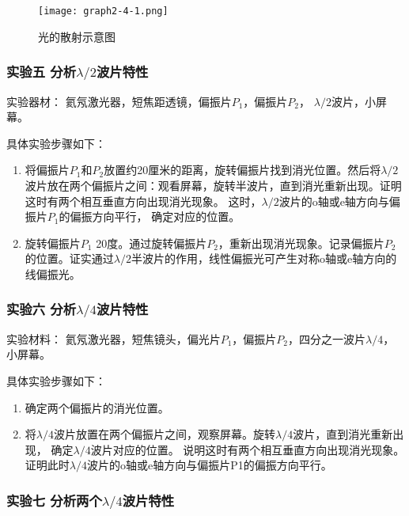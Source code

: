 \documentclass[dvipsnames, svgnames,a4paper,11pt]{article}
\begin{document}
	\begin{figure}[htbp]
		\centering
		\texttt{[image: graph2-4-1.png]}
		\caption{光的散射示意图}
		\label{fig:graph2-4-1}
	\end{figure}



	\subsubsection{实验五 \quad 分析$\lambda/2$波片特性}

	实验器材： 氦氖激光器，短焦距透镜，偏振片$P_1$，偏振片$P_2$， $\lambda/2$波片，小屏幕。

	具体实验步骤如下：
	\begin{enumerate}
		\item 将偏振片$P_1$和$P_2$放置约20厘米的距离，旋转偏振片找到消光位置。然后将$\lambda/2$波片放在两个偏振片之间：观看屏幕，旋转半波片，直到消光重新出现。证明这时有两个相互垂直方向出现消光现象。 这时，$\lambda/2$波片的o轴或e轴方向与偏振片$P_1$的偏振方向平行， 确定对应的位置。
		\item 旋转偏振片$P_1$ 20度。通过旋转偏振片$P_2$，重新出现消光现象。记录偏振片$P_2$的位置。证实通过$\lambda/2$半波片的作用，线性偏振光可产生对称o轴或e轴方向的线偏振光。
	\end{enumerate}



	\subsubsection{实验六 \quad 分析$\lambda/4$波片特性}

	实验材料： 氦氖激光器，短焦镜头，偏光片$P_1$，偏振片$P_2$，四分之一波片$\lambda/4$，小屏幕。

	具体实验步骤如下：
	\begin{enumerate}
		\item 确定两个偏振片的消光位置。
		\item 将$\lambda/4$波片放置在两个偏振片之间，观察屏幕。旋转$\lambda/4$波片，直到消光重新出现， 确定$\lambda/4$波片对应的位置。 说明这时有两个相互垂直方向出现消光现象。 证明此时$\lambda/4$波片的o轴或e轴方向与偏振片P1的偏振方向平行。
	\end{enumerate}





	\subsubsection{实验七 \quad 分析两个$\lambda/4$波片特性}
\end{document}
